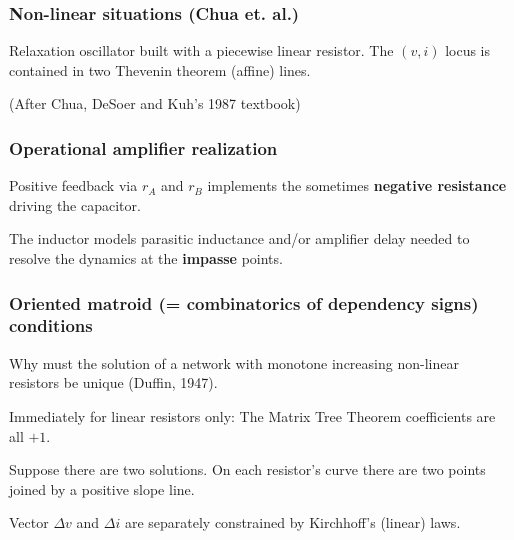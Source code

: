 \documentclass{beamer}
\begin{document}
\begin{frame}
\frametitle{Non-linear situations (Chua et. al.) }
Relaxation oscillator built with a piecewise linear resistor.
The $(v,i)$ locus is contained in two Thevenin theorem (affine) lines.


\begin{minipage}[t]{1.6in}
(After Chua, DeSoer and Kuh's 1987 textbook)
\end{minipage}



\end{frame}

\begin{frame}
\frametitle{Operational amplifier realization}

Positive feedback via $r_A$ and $r_B$ 
implements the sometimes \textbf{negative resistance} driving the capacitor.





\begin{minipage}[b]{1.5in}
The inductor models parasitic inductance and/or amplifier delay needed to
resolve the dynamics at the \textbf{impasse} points.
\end{minipage}


\end{frame}

\begin{frame}
\frametitle{Oriented matroid (= combinatorics of dependency signs) 
conditions}

Why must the solution of a network with monotone 
increasing non-linear resistors be unique (Duffin, 1947).

Immediately for linear resistors only: The Matrix Tree Theorem coefficients
are all $+1$.


Suppose there are two solutions.  On each resistor's curve there are two
points joined by a positive slope line.


\begin{minipage}[b]{1.7in}
Vector $\Delta v$ and $\Delta i$ are separately constrained by 
Kirchhoff's (linear) laws.
\end{minipage}

\end{frame}
\end{document}
